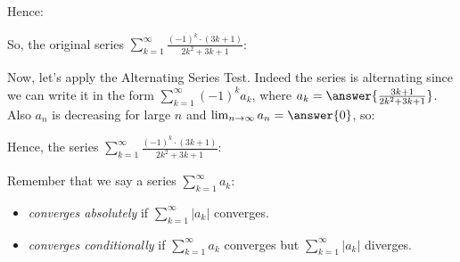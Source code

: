\documentclass{ximera}
\begin{document}
\begin{exercise}
\begin{exercise}
Hence:

\begin{multipleChoice}
\end{multipleChoice}

So, the original series $\sum_{k=1}^{\infty} \frac{(-1)^k \cdot(3k+1)}{2k^2+3k+1}$:
\begin{multipleChoice}
\end{multipleChoice}

\begin{exercise}
Now, let's apply the Alternating Series Test.  Indeed the series is alternating since we can write it in the form $\sum_{k=1}^{\infty} (-1)^k a_k$, where $a_k = \answer{\frac{3k+1}{2k^2+3k+1}}$. Also $a_n$ is decreasing for large $n$ and $\lim_{n \to \infty} a_n = \answer{0}$, so:

\begin{multipleChoice}
\end{multipleChoice}

Hence, the series $\sum_{k=1}^{\infty} \frac{(-1)^k \cdot(3k+1)}{2k^2+3k+1}$:

\begin{multipleChoice}
\end{multipleChoice}

\begin{hint}
Remember that we say a series $\sum_{k=1}^{\infty} a_k$:

\begin{itemize}
\item \emph{converges absolutely} if $\sum_{k=1}^{\infty} |a_k|$ converges.
\item  \emph{converges conditionally} if $\sum_{k=1}^{\infty} a_k$ converges but $\sum_{k=1}^{\infty} |a_k|$ diverges.
\end{itemize}

\end{hint}

\end{exercise}

\end{exercise}
\end{exercise}
\end{document}

